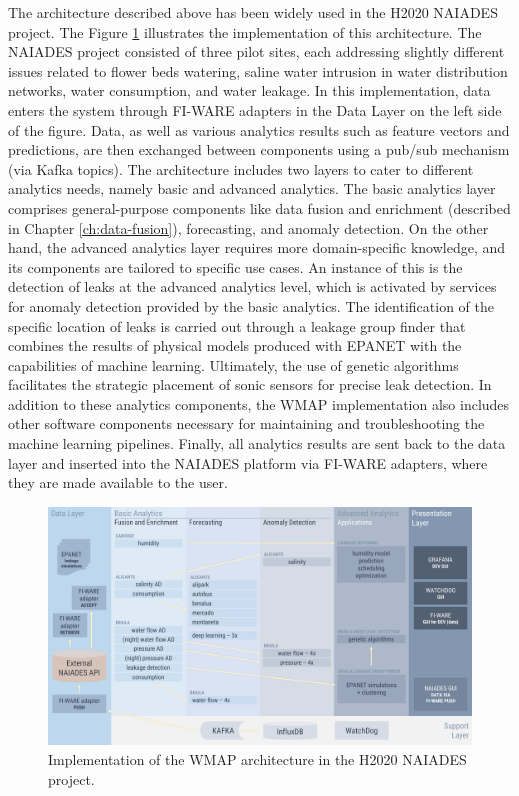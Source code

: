 The architecture described above has been widely used in the H2020 NAIADES project.
The Figure \ref{fig:naiades_architecture} illustrates the implementation of this architecture.
The NAIADES project consisted of three pilot sites, each addressing slightly different issues related to flower beds watering, saline water intrusion in water distribution networks, water consumption, and water leakage. 
In this implementation, data enters the system through FI-WARE adapters in the Data Layer on the left side of the figure. 
Data, as well as various analytics results such as feature vectors and predictions, are then exchanged between components using a pub/sub mechanism (via Kafka topics). 
The architecture includes two layers to cater to different analytics needs, namely basic and advanced analytics. 
The basic analytics layer comprises general-purpose components like data fusion and enrichment (described in Chapter \ref{ch:data-fusion}), forecasting, and anomaly detection.
On the other hand, the advanced analytics layer requires more domain-specific knowledge, and its components are tailored to specific use cases.
An instance of this is the detection of leaks at the advanced analytics level, which is activated by services for anomaly detection provided by the basic analytics. 
The identification of the specific location of leaks is carried out through a leakage group finder that combines the results of physical models produced with EPANET with the capabilities of machine learning. 
Ultimately, the use of genetic algorithms facilitates the strategic placement of sonic sensors for precise leak detection.
In addition to these analytics components, the WMAP implementation also includes other software components necessary for maintaining and troubleshooting the machine learning pipelines. 
Finally, all analytics results are sent back to the data layer and inserted into the NAIADES platform via FI-WARE adapters, where they are made available to the user.

\begin{figure}
    \centering
    \includegraphics[width=15cm]{figures/architecture-naiades.pdf}
    \caption{Implementation of the WMAP architecture in the H2020 NAIADES project.}
    \label{fig:naiades_architecture}
\end{figure}

